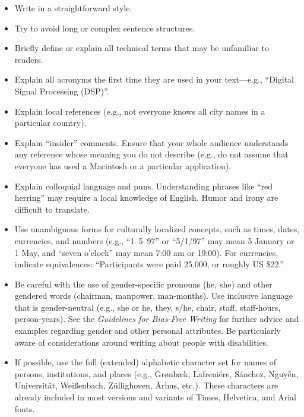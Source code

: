 \documentclass{sigchi}
\begin{document}
\begin{itemize}
\item Write in a straightforward style.
\item Try to avoid long or complex sentence structures.
\item Briefly define or explain all technical terms that may be
  unfamiliar to readers.
\item Explain all acronyms the first time they are used in your
  text---e.g., ``Digital Signal Processing (DSP)''.
\item Explain local references (e.g., not everyone knows all city
  names in a particular country).
\item Explain ``insider'' comments. Ensure that your whole audience
  understands any reference whose meaning you do not describe (e.g.,
  do not assume that everyone has used a Macintosh or a particular
  application).
\item Explain colloquial language and puns. Understanding phrases like
  ``red herring'' may require a local knowledge of English.  Humor and
  irony are difficult to translate.
\item Use unambiguous forms for culturally localized concepts, such as
  times, dates, currencies, and numbers (e.g., ``1--5--97'' or
  ``5/1/97'' may mean 5 January or 1 May, and ``seven o'clock'' may
  mean 7:00 am or 19:00). For currencies, indicate equivalences:
  ``Participants were paid {\selectfont \textwon}
  25,000, or roughly US \$22.''
\item Be careful with the use of gender-specific pronouns (he, she)
  and other gendered words (chairman, manpower, man-months). Use
  inclusive language that is gender-neutral (e.g., she or he, they,
  s/he, chair, staff, staff-hours, person-years). See the
  \textit{Guidelines for Bias-Free Writing} for further advice and
  examples regarding gender and other personal
  attributes. Be particularly aware of
  considerations around writing about people with disabilities.
\item If possible, use the full (extended) alphabetic character set
  for names of persons, institutions, and places (e.g.,
  Gr{\o}nb{\ae}k, Lafreni\'ere, S\'anchez, Nguy{\~{\^{e}}}n,
  Universit{\"a}t, Wei{\ss}enbach, Z{\"u}llighoven, \r{A}rhus, etc.).
  These characters are already included in most versions and variants
  of Times, Helvetica, and Arial fonts.
\end{itemize}
\end{document}

